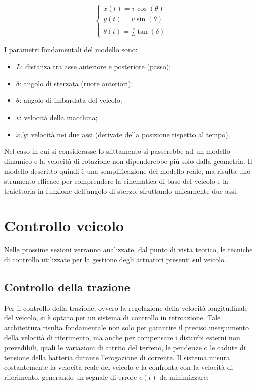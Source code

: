 \documentclass[11pt]{report}
\begin{document}
\begin{equation}
    \begin{cases}
        \dot{x}(t) = v \cos(\theta) \\
        \dot{y}(t) = v \sin(\theta) \\
        \dot{\theta}(t) = \frac{v}{L} \tan(\delta)
    \end{cases}
\end{equation}

\noindent I parametri fondamentali del modello sono:
\begin{itemize}
    \item $L$: distanza tra asse anteriore e posteriore (passo);
    \item $\delta$: angolo di sterzata (ruote anteriori);
    \item $\theta$: angolo di imbardata del veicolo;
    \item $v$: velocità della macchina;
    \item $\dot{x}, \dot{y}$: velocità nei due assi (derivate della posizione rispetto al tempo).
\end{itemize}
\noindent
Nel caso in cui si considerasse lo slittamento si passerebbe ad un modello dinamico e la velocità di rotazione non dipenderebbe più solo dalla geometria. Il modello descritto quindi è una semplificazione del modello reale, ma risulta uno strumento efficace per comprendere la cinematica di base del veicolo e la traiettoria in funzione dell'angolo di sterzo, sfruttando unicamente due assi.
\section{Controllo veicolo}
Nelle prossime sezioni verranno analizzate, dal punto di vista teorico, le tecniche di controllo
utilizzate per la gestione degli attuatori presenti sul veicolo.

\subsection{Controllo della trazione}
Per il controllo della trazione, ovvero la regolazione della velocità longitudinale del veicolo, si è optato per un sistema di controllo in retroazione. Tale architettura risulta fondamentale non solo per garantire il preciso inseguimento della velocità di riferimento, ma anche per compensare i disturbi esterni non prevedibili, quali le variazioni di attrito del terreno, le pendenze o le cadute di tensione della batteria durante l'erogazione di corrente.
\noindent Il sistema misura costantemente la velocità reale del veicolo e la confronta con la velocità di riferimento, generando un segnale di errore $e(t)$ da minimizzare:
\end{document}
